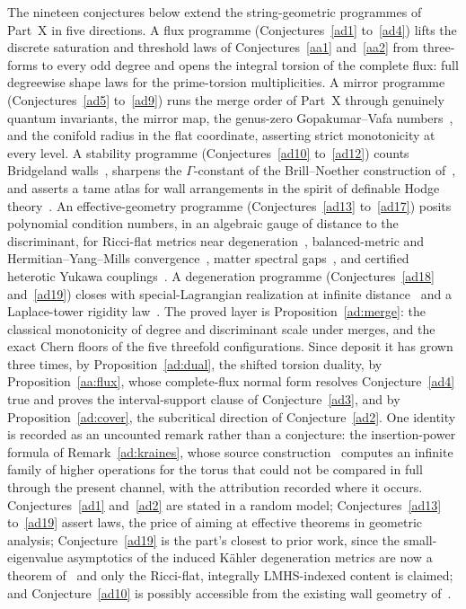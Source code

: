 \documentclass[11pt]{article}
\theoremstyle{definition}
\begin{document}
The nineteen conjectures below extend the string-geometric programmes of Part~X in five directions.  A flux programme (Conjectures~\ref{ad1} to~\ref{ad4}) lifts the discrete saturation and threshold laws of Conjectures~\ref{aa1} and~\ref{aa2} from three-forms to every odd degree and opens the integral torsion of the complete flux: full degreewise shape laws for the prime-torsion multiplicities.  A mirror programme (Conjectures~\ref{ad5} to~\ref{ad9}) runs the merge order of Part~X through genuinely quantum invariants, the mirror map, the genus-zero Gopakumar--Vafa numbers~\cite{HKTY95,Zin14}, and the conifold radius in the flat coordinate, asserting strict monotonicity at every level.  A stability programme (Conjectures~\ref{ad10} to~\ref{ad12}) counts Bridgeland walls~\cite{JM19,BM22}, sharpens the $\Gamma$-constant of the Brill--Noether construction of~\cite{FKLR25}, and asserts a tame atlas for wall arrangements in the spirit of definable Hodge theory~\cite{BKT20}.  An effective-geometry programme (Conjectures~\ref{ad13} to~\ref{ad17}) posits polynomial condition numbers, in an algebraic gauge of distance to the discriminant, for Ricci-flat metrics near degeneration~\cite{Li20,SZ19}, balanced-metric and Hermitian--Yang--Mills convergence~\cite{BHJMM26,CSYZ26,Chu12,ABKO10}, matter spectral gaps~\cite{Ash24,AHHO23}, and certified heterotic Yukawa couplings~\cite{But24,Con24}.  A degeneration programme (Conjectures~\ref{ad18} and~\ref{ad19}) closes with special-Lagrangian realization at infinite distance~\cite{HMWW26,MWW26} and a Laplace-tower rigidity law~\cite{AR21,AhR23}.  The proved layer is Proposition~\ref{ad:merge}: the classical monotonicity of degree and discriminant scale under merges, and the exact Chern floors of the five threefold configurations.  Since deposit it has grown three times, by Proposition~\ref{ad:dual}, the shifted torsion duality, by Proposition~\ref{aa:flux}, whose complete-flux normal form resolves Conjecture~\ref{ad4} true and proves the interval-support clause of Conjecture~\ref{ad3}, and by Proposition~\ref{ad:cover}, the subcritical direction of Conjecture~\ref{ad2}.  One identity is recorded as an uncounted remark rather than a conjecture: the insertion-power formula of Remark~\ref{ad:kraines}, whose source construction~\cite{LME24} computes an infinite family of higher operations for the torus that could not be compared in full through the present channel, with the attribution recorded where it occurs.  Conjectures~\ref{ad1} and~\ref{ad2} are stated in a random model; Conjectures~\ref{ad13} to~\ref{ad19} assert laws, the price of aiming at effective theorems in geometric analysis; Conjecture~\ref{ad19} is the part's closest to prior work, since the small-eigenvalue asymptotics of the induced K\"ahler degeneration metrics are now a theorem of~\cite{Cao26} and only the Ricci-flat, integrally LMHS-indexed content is claimed; and Conjecture~\ref{ad10} is possibly accessible from the existing wall geometry of~\cite{JM19}.
\end{document}
